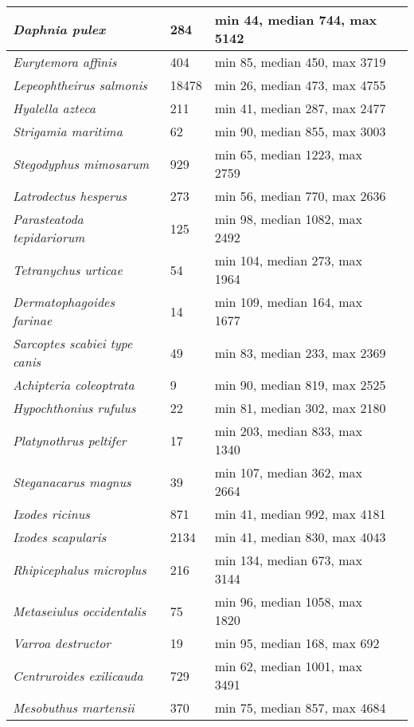 {\begin{longtable}{| L{4cm} | L{2cm}  | L{5cm} | L{4cm} |}
\textit{Daphnia pulex} & 284 & min 44, median 744, max 5142 & \\ \hline
\textit{Eurytemora affinis} & 404 & min 85, median 450, max 3719 & \\ \hline
\textit{Lepeophtheirus salmonis} & 18478 & min 26, median 473, max 4755 & \\ \hline
\textit{Hyalella azteca} & 211 & min 41, median 287, max 2477 & \\ \hline
\textit{Strigamia maritima} & 62 & min 90, median 855, max 3003 & \\ \hline
\textit{Stegodyphus mimosarum} & 929 & min 65, median 1223, max 2759 & \\ \hline
\textit{Latrodectus hesperus} & 273 & min 56, median 770, max 2636 & \\ \hline
\textit{Parasteatoda tepidariorum} & 125 & min 98, median 1082, max 2492 & \\ \hline
\textit{Tetranychus urticae} & 54 & min 104, median 273, max 1964 & \\ \hline
\textit{Dermatophagoides farinae} & 14 & min 109, median 164, max 1677 & \\ \hline
\textit{Sarcoptes scabiei type canis} & 49 & min 83, median 233, max 2369 & \\ \hline
\textit{Achipteria coleoptrata} & 9 & min 90, median 819, max 2525 & \\ \hline
\textit{Hypochthonius rufulus} & 22 & min 81, median 302, max 2180 & \\ \hline
\textit{Platynothrus peltifer} & 17 & min 203, median 833, max 1340 & \\ \hline
\textit{Steganacarus magnus} & 39 & min 107, median 362, max 2664 & \\ \hline
\textit{Ixodes ricinus} & 871 & min 41, median 992, max 4181 & \\ \hline
\textit{Ixodes scapularis} & 2134 & min 41, median 830, max 4043 & \\ \hline
\textit{Rhipicephalus microplus} & 216 & min 134, median 673, max 3144 & \\ \hline
\textit{Metaseiulus occidentalis} & 75 & min 96, median 1058, max 1820 & \\ \hline
\textit{Varroa destructor} & 19 & min 95, median 168, max 692 & \\ \hline
\textit{Centruroides exilicauda} & 729 & min 62, median 1001, max 3491 & \\ \hline
\textit{Mesobuthus martensii} & 370 & min 75, median 857, max 4684 & \\ \hline

\end{longtable}}
